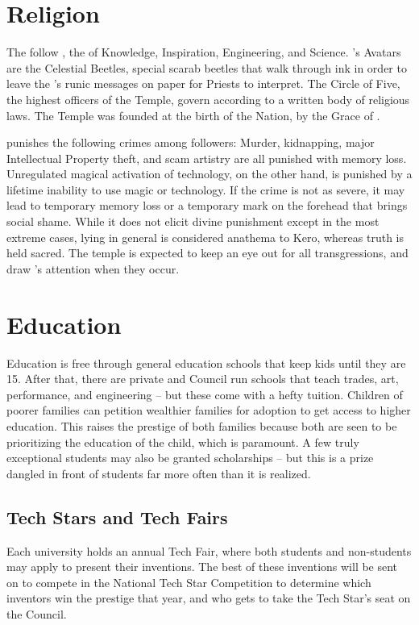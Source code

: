 \documentclass[blue]{GL2020}
\begin{document}
\section*{Religion}
The \pTechies{} follow \cTechGod{}, the \cTechGod{\God} of Knowledge, Inspiration, Engineering, and Science. \cTechGod{}'s Avatars are the Celestial Beetles, special scarab beetles that walk through ink in order to leave the \cTechGod{\God}'s runic messages on paper for Priests to interpret.  The Circle of Five, the highest officers of the Temple, govern according to a written body of religious laws.  The Temple was founded at the birth of the Nation, by the Grace of \cTechGod{}.

\cTechGod{} punishes the following crimes among \cTechGod{\their} followers: Murder, kidnapping, major Intellectual Property theft, and scam artistry are all punished with memory loss.  Unregulated magical activation of technology, on the other hand, is punished by a lifetime inability to use magic or technology.  If the crime is not as severe, it may lead to temporary memory loss or a temporary mark on the forehead that brings social shame.  While it does not elicit divine punishment except in the most extreme cases, lying in general is considered anathema to Kero, whereas truth is held sacred.  The temple is expected to keep an eye out for all transgressions, and draw \cTechGod{}'s attention when they occur.

	
\section*{Education}
Education is free through general education schools that keep kids until they are 15.  After that, there are private and Council run schools that teach trades, art, performance, and engineering -- but these come with a hefty tuition.  Children of poorer families can petition wealthier families for adoption to get access to higher education.  This raises the prestige of both families because both are seen to be prioritizing the education of the child, which is paramount.  A few truly exceptional students may also be granted scholarships -- but this is a prize dangled in front of students far more often than it is realized. 

\subsection*{Tech Stars and Tech Fairs}
Each university holds an annual Tech Fair, where both students and non-students may apply to present their inventions.  The best of these inventions will be sent on to compete in the National Tech Star Competition to determine which inventors win the prestige that year, and who gets to take the Tech Star's seat on the Council.
\end{document}
